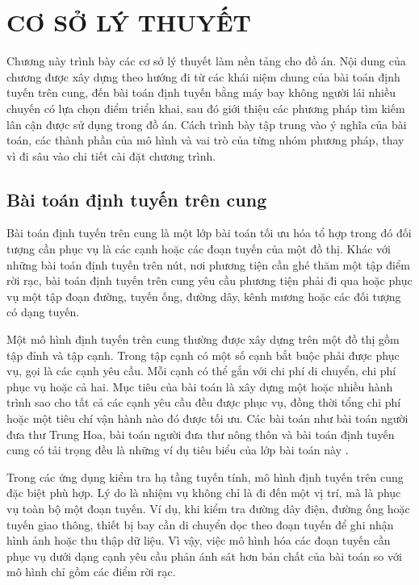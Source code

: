 \chapter{CƠ SỞ LÝ THUYẾT}
\label{chap:co-so-ly-thuyet}

Chương này trình bày các cơ sở lý thuyết làm nền tảng cho đồ án. Nội dung của chương được xây dựng theo hướng đi từ các khái niệm chung của bài toán định tuyến trên cung, đến bài toán định tuyến bằng máy bay không người lái nhiều chuyến có lựa chọn điểm triển khai, sau đó giới thiệu các phương pháp tìm kiếm lân cận được sử dụng trong đồ án. Cách trình bày tập trung vào ý nghĩa của bài toán, các thành phần của mô hình và vai trò của từng nhóm phương pháp, thay vì đi sâu vào chi tiết cài đặt chương trình.

\section{Bài toán định tuyến trên cung}

Bài toán định tuyến trên cung là một lớp bài toán tối ưu hóa tổ hợp trong đó đối tượng cần phục vụ là các cạnh hoặc các đoạn tuyến của một đồ thị. Khác với những bài toán định tuyến trên nút, nơi phương tiện cần ghé thăm một tập điểm rời rạc, bài toán định tuyến trên cung yêu cầu phương tiện phải đi qua hoặc phục vụ một tập đoạn đường, tuyến ống, đường dây, kênh mương hoặc các đối tượng có dạng tuyến.

Một mô hình định tuyến trên cung thường được xây dựng trên một đồ thị gồm tập đỉnh và tập cạnh. Trong tập cạnh có một số cạnh bắt buộc phải được phục vụ, gọi là các cạnh yêu cầu. Mỗi cạnh có thể gắn với chi phí di chuyển, chi phí phục vụ hoặc cả hai. Mục tiêu của bài toán là xây dựng một hoặc nhiều hành trình sao cho tất cả các cạnh yêu cầu đều được phục vụ, đồng thời tổng chi phí hoặc một tiêu chí vận hành nào đó được tối ưu. Các bài toán như bài toán người đưa thư Trung Hoa, bài toán người đưa thư nông thôn và bài toán định tuyến cung có tải trọng đều là những ví dụ tiêu biểu của lớp bài toán này \cite{golden1981arp,campbell2018darp}.

Trong các ứng dụng kiểm tra hạ tầng tuyến tính, mô hình định tuyến trên cung đặc biệt phù hợp. Lý do là nhiệm vụ không chỉ là đi đến một vị trí, mà là phục vụ toàn bộ một đoạn tuyến. Ví dụ, khi kiểm tra đường dây điện, đường ống hoặc tuyến giao thông, thiết bị bay cần di chuyển dọc theo đoạn tuyến để ghi nhận hình ảnh hoặc thu thập dữ liệu. Vì vậy, việc mô hình hóa các đoạn tuyến cần phục vụ dưới dạng cạnh yêu cầu phản ánh sát hơn bản chất của bài toán so với mô hình chỉ gồm các điểm rời rạc.

